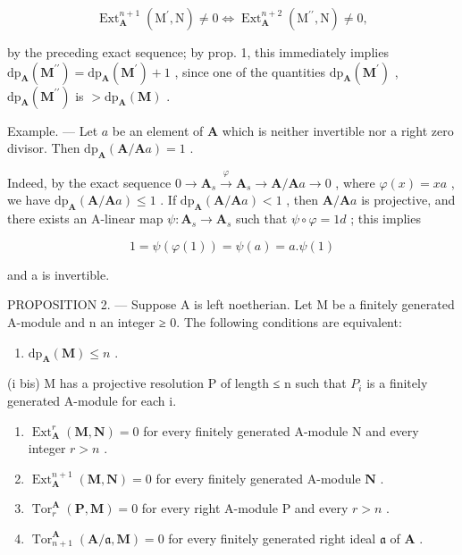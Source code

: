 \[
\operatorname{Ext} _ {\mathbf {A}} ^ {n + 1} \left(\mathrm{M} ^ {\prime}, \mathrm{N}\right) \neq 0 \Leftrightarrow \operatorname{Ext} _ {\mathbf {A}} ^ {n + 2} \left(\mathrm{M} ^ {\prime \prime}, \mathrm{N}\right) \neq 0,
\]

by the preceding exact sequence; by prop. 1, this immediately implies \(\mathrm{dp}_{\mathbf{A}}(\mathbf{M}^{\prime \prime}) = \mathrm{dp}_{\mathbf{A}}(\mathbf{M}^{\prime}) + 1\) , since one of the quantities \(\mathrm{dp}_{\mathbf{A}}(\mathbf{M}^{\prime})\) , \(\mathrm{dp}_{\mathbf{A}}(\mathbf{M}^{\prime \prime})\) is \(> \mathrm{dp}_{\mathbf{A}}(\mathbf{M})\) .

Example. --- Let \(a\) be an element of \(\mathbf{A}\) which is neither invertible nor a right zero divisor. Then \(\mathrm{dp}_{\mathbf{A}}(\mathbf{A}/\mathbf{A}a)=1\) .

Indeed, by the exact sequence \(0 \to \mathbf{A}_s \xrightarrow{\varphi} \mathbf{A}_s \to \mathbf{A} / \mathbf{A}a \to 0\) , where \(\varphi(x) = xa\) , we have \(\mathrm{dp}_{\mathbf{A}}(\mathbf{A} / \mathbf{A}a) \leqslant 1\) . If \(\mathrm{dp}_{\mathbf{A}}(\mathbf{A} / \mathbf{A}a) < 1\) , then \(\mathbf{A} / \mathbf{A}a\) is projective, and there exists an A-linear map \(\psi : \mathbf{A}_s \to \mathbf{A}_s\) such that \(\psi \circ \varphi = 1d\) ; this implies

\[
1 = \psi (\varphi (1)) = \psi (a) = a. \psi (1)
\]

and a is invertible.

PROPOSITION 2. --- Suppose A is left noetherian. Let M be a finitely generated A-module and n an integer ≥ 0. The following conditions are equivalent:

\begin{enumerate}
\def\labelenumi{(\roman{enumi})}
\tightlist
\item
  \(\mathrm{dp}_{\mathbf{A}}(\mathbf{M}) \leqslant n\) .
\end{enumerate}

(i bis) M has a projective resolution P of length ≤ n such that \(P_{i}\) is a finitely generated A-module for each i.

\begin{enumerate}
\def\labelenumi{(\roman{enumi})}
\setcounter{enumi}{1}
\item
  \(\operatorname{Ext}_{\mathbf{A}}^{r}(\mathbf{M},\mathbf{N}) = 0\) for every finitely generated A-module N and every integer \(r > n\) .
\item
  \(\operatorname{Ext}_{\mathbf{A}}^{n+1}(\mathbf{M}, \mathbf{N}) = 0\) for every finitely generated A-module \(\mathbf{N}\) .
\item
  \(\operatorname{Tor}_r^{\mathbf{A}}(\mathbf{P},\mathbf{M}) = 0\) for every right A-module P and every \(r > n\) .
\item
  \(\operatorname{Tor}_{n+1}^{\mathbf{A}}(\mathbf{A}/\mathfrak{a},\mathbf{M}) = 0\) for every finitely generated right ideal \(\mathfrak{a}\) of \(\mathbf{A}\) .
\end{enumerate}

